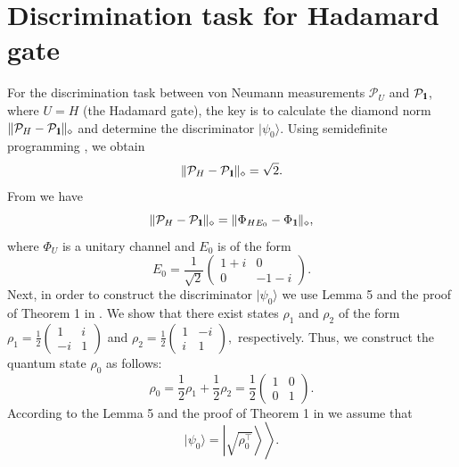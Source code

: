 \documentclass[preprint,12pt, a4paper, dvipsnames]{elsarticle}
\newcommand{\ket}[1]{\ensuremath{|#1\rangle}}
\newcommand{\1}{{\rm 1\hspace{-0.9mm}l}}
\newcommand{\Id}{{\rm 1\hspace{-0.9mm}l}}
\newcommand{\PP}{\mathcal{P}}
\theoremstyle{definition}
\begin{document}
\section{Discrimination task for Hadamard gate}\label{app:hadamard}
For the discrimination task between von Neumann measurements $\PP_{U}$ and $\PP_\Id$, where $U = H$ (the Hadamard gate),  the key is to calculate the diamond norm $\| \mathcal{P}_H - \PP_\Id \|_\diamond$ and
determine the discriminator $\ket{\psi_0}$.
Using semidefinite programming \cite{watrous2021simplier}, we obtain
\begin{equation}
\| \mathcal{P}_H - \PP_\Id \|_\diamond = \sqrt{2}.
\end{equation}
From \cite{lewandowska2021certification} we have
\begin{equation}
\| \PP_{H} - \PP_{\Id} \|_\diamond = \| \Phi_{HE_0} - \Phi_{\Id}\|_\diamond,
\end{equation}
where $\Phi_{U}$ is a unitary channel and
 $E_0$
is of the form
\begin{equation}
E_0 = \frac{1}{\sqrt{2}} \left( \begin{matrix}
1 + i & 0  \\  0 & -1-i
\end{matrix} \right).
\end{equation}
Next, in order to construct the discriminator $\ket{\psi_0}$ we use Lemma 5 and the proof of Theorem 1 in \cite{puchala2018strategies}. We show that there exist states
 $\rho_1 $  and $\rho_2$ of the form $ \rho_1  = \frac{1}{2} \left( \begin{matrix}
 1  & i  \\  -i & 1
 \end{matrix} \right)  $  and $\rho_2 = \frac{1}{2} \left( \begin{matrix}
 1 & -i \\  i & 1
 \end{matrix} \right), $ respectively. Thus, we construct the quantum state $\rho_0$ as follows:
 \begin{equation}
 \rho_0 = \frac{1}{2} \rho_1 + \frac{1}{2} \rho_2 = \frac{1}{2} \left( \begin{matrix}
 1  &  0  \\  0  & 1
 \end{matrix} \right).
 \end{equation}
 According to the Lemma 5 and the proof of Theorem 1 in \cite{puchala2018strategies} we assume that \begin{equation}
 \ket{\psi_0} = \left.\left| \sqrt{\rho_0^\top}\right\rangle \right\rangle.
 \end{equation}
\end{document}
